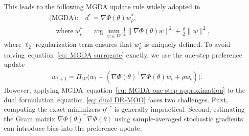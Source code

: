 \documentclass[twoside]{article} %
\def\eqref#1{equation~\ref{#1}}
\theoremstyle{plain}
\theoremstyle{definition}
\theoremstyle{remark}
\begin{document}
This leads to the following MGDA update rule widely adopted in~\citet{stochasticMGDA,SDMkaiyiJi,qimgda,MODO}
\begin{align}
&\text{(MGDA):} \quad d^* =\nabla\Phi(\theta)w_{\rho}^*,\nonumber \\
&\quad\text{where} ~ w_{\rho}^* =\arg\min_{w\in W}\frac{1}{2}\|\nabla \Phi(\theta)w\|^2+\frac{\rho}{2}\|w\|^2, \label{eq: MGDA surrogate}
\end{align}
where \(\ell_2\)-regularization term ensures that \(w_\rho^\star\) is uniquely defined. To avoid solving~\eqref{eq: MGDA surrogate} exactly, we use the one-step preference update
\begin{align}
    w_{t+1}=\Pi_\mathcal{W}\big(w_t-(\nabla\Phi(\theta)^{\top}\nabla\Phi(\theta)w_t+\rho w_t)\big).
    \label{eq: MGDA one-step approximation}
\end{align}
However, applying MGDA~\eqref{eq: MGDA one-step approximation} to the dual formulation~\eqref{eq: dual DR-MOO} faces two challenges. First, computing the exact minimizers \(\eta^{i,*}\) is generally impractical. Second, estimating the Gram matrix \(\nabla\Phi(\theta)^\top\nabla\Phi(\theta)\) using sample-averaged stochastic gradients can introduce bias into the preference update.
\end{document}

